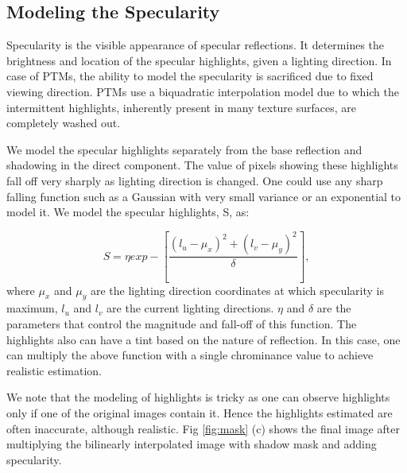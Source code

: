\subsection{Modeling the Specularity}

Specularity is the visible appearance of specular reflections. It determines the
brightness and location of the specular highlights, given a lighting direction.
In case of PTMs, the ability to model the specularity is sacrificed due to fixed
viewing direction. PTMs use a biquadratic interpolation model due to which the
intermittent highlights, inherently present in many texture surfaces, are
completely washed out.

We model the specular highlights separately from the base reflection and
shadowing in the direct component. The value of pixels showing these highlights
fall off very sharply as lighting direction is changed. One could use any sharp
falling function such as a Gaussian with very small variance or an exponential
to model it. We model the specular highlights, S, as:

\begin{equation}
S= \eta exp-\left[\frac{({l_u-\mu_x})^2 + ({l_v-\mu_y})^2}{\delta}\right],
\end{equation}
where $\mu_x$ and $\mu_y$ are the lighting direction coordinates at which
specularity is maximum, $l_u$ and $l_v$ are the current lighting directions.
$\eta$ and $\delta$ are the parameters that control the
magnitude and fall-off of this function. The highlights also can have a tint
based on the nature of reflection. In this case, one can multiply the above
function with a single chrominance value to achieve realistic estimation.

We note that the modeling of highlights is tricky as one can observe highlights
only if one of the original images contain it. Hence the highlights estimated
are often inaccurate, although realistic. Fig \ref{fig:mask} (c) shows
the final image after multiplying the bilinearly interpolated image with shadow
mask and adding specularity.

